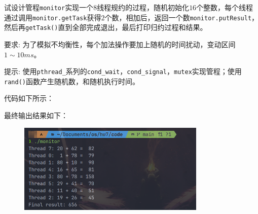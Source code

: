 
试设计管程{\tt monitor}实现一个$8$线程规约的过程，随机初始化$16$个整数，每个线程通过调用{\tt monitor.getTask}获得$2$个数，相加后，返回一个数{\tt monitor.putResult}，然后再{\tt getTask()}直到全部完成退出，最后打印归约过程和结果。

要求: 为了模拟不均衡性，每个加法操作要加上随机的时间扰动，变动区间$1 \sim 10ms$。

提示: 使用{\tt  pthread_}系列的{\tt cond_wait}，{\tt cond_signal}，{\tt mutex}实现管程；使用{\tt rand()}函数产生随机数，和随机执行时间。

\begin{solution}

代码如下所示：



最终输出结果如下：

\begin{figure}[H]
    \centering
    \includegraphics[width=0.8\textwidth]{img/monitor.png}
\end{figure}

\end{solution}
